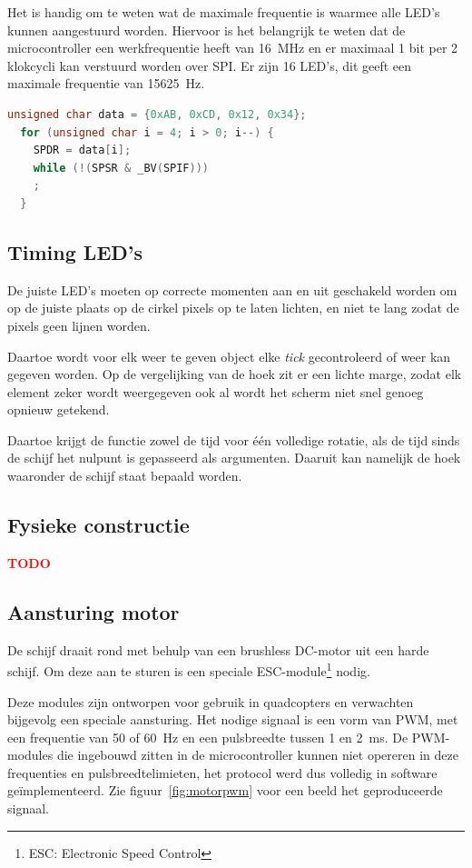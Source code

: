 \documentclass[a4paper, 12pt]{article}
\newcommand{\TODO}[1]{\textcolor{red}{\large\textbf{TODO}}\todo{#1}}
\begin{document}
Het is handig om te weten wat de maximale frequentie is waarmee alle LED's
kunnen aangestuurd worden.
Hiervoor is het belangrijk te weten dat de microcontroller
een werkfrequentie heeft van \SI{16}{\mega\hertz}
en er maximaal 1 bit per 2 klokcycli kan verstuurd worden over SPI.
Er zijn 16 LED's, dit geeft een maximale frequentie van \SI{15625}{\hertz}.

\begin{lstlisting}[frame=lines,language=C,float,caption={Blocking SPI in C},label={lst:spiblocking}]
  unsigned char data = {0xAB, 0xCD, 0x12, 0x34};
  for (unsigned char i = 4; i > 0; i--) {
    SPDR = data[i];
    while (!(SPSR & _BV(SPIF)))
    ;
  }
\end{lstlisting}

\subsection{Timing LED's}
\label{sec:ledtiming}
De juiste LED's moeten op correcte momenten aan en uit geschakeld worden
om op de juiste plaats op de cirkel pixels op te laten lichten,
en niet te lang zodat de pixels geen lijnen worden.

Daartoe wordt voor elk weer te geven object elke \emph{tick} gecontroleerd of
weer kan gegeven worden. Op de vergelijking van de hoek zit er een lichte marge,
zodat elk element zeker wordt weergegeven ook al wordt het scherm niet snel
genoeg opnieuw getekend.

Daartoe krijgt de functie zowel de tijd voor één volledige rotatie,
als de tijd sinds de schijf het nulpunt is gepasseerd als argumenten.
Daaruit kan namelijk de hoek waaronder de schijf staat bepaald worden.

\subsection{Fysieke constructie}
\TODO{Fysieke constructie}

\subsection{Aansturing motor}
De schijf draait rond met behulp van een brushless DC-motor uit een harde schijf.
Om deze aan te sturen is een speciale ESC-module\footnote{ESC: Electronic Speed Control} nodig.

Deze modules zijn ontworpen voor gebruik in quadcopters en verwachten bijgevolg
een speciale aansturing.
Het nodige signaal is een vorm van PWM, met een frequentie van 50 of
\SI{60}{\hertz}
en een pulsbreedte tussen 1 en \SI{2}{\milli\second}.
De PWM-modules die ingebouwd zitten in de microcontroller kunnen niet opereren
in deze frequenties en pulsbreedtelimieten,
het protocol werd dus volledig in software geïmplementeerd.
Zie figuur~\ref{fig:motorpwm} voor een beeld het geproduceerde signaal.
\end{document}
